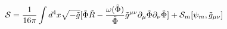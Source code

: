\begin{equation}
\label{acao_JF}
 {\cal{S}} = \frac{1}{16 \pi} \int d^4 x \sqrt{-\tilde{g}} [ \tilde{\Phi} \tilde{R} - \frac{\omega(\tilde{\Phi})}{\tilde{\Phi}}
\tilde{g} ^{\mu \nu} \partial _{\mu} \tilde{\Phi} \partial _{\nu} \tilde{\Phi} ] + {\cal{S}} _{m} [\psi _m, \tilde{g} _{\mu \nu}]
\end{equation}

